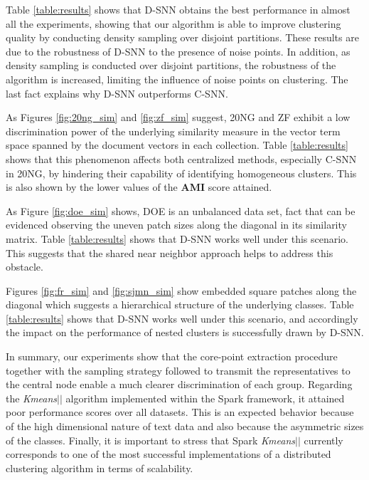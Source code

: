 \documentclass[smallextended]{svjour3}       %
\begin{document}
\noindent Table \ref{table:results} shows that D-SNN obtains the best performance in almost all the experiments, showing that our algorithm is able to improve clustering quality by conducting density sampling over disjoint partitions. These results are due to the robustness of D-SNN to the presence of noise points. In addition, as density sampling is conducted over disjoint partitions, the robustness of the algorithm is increased, limiting the influence of noise points on clustering. The last fact explains why D-SNN outperforms C-SNN.    


As Figures \ref{fig:20ng_sim} and \ref{fig:zf_sim} suggest, 20NG and ZF exhibit a low discrimination power of the underlying similarity measure in the vector term space spanned by the document vectors in each collection. Table \ref{table:results} shows that this phenomenon affects both centralized methods, especially C-SNN in 20NG, by hindering their capability of identifying homogeneous clusters. This is also shown by the lower values of the \textbf{AMI} score attained.

As Figure \ref{fig:doe_sim} shows, DOE is an unbalanced data set, fact that can be evidenced observing the uneven patch sizes along the diagonal in its similarity matrix. 
Table \ref{table:results} shows that D-SNN works well under this scenario. 
This suggests that the shared near neighbor approach helps to address this obstacle.

Figures \ref{fig:fr_sim} and \ref{fig:sjmn_sim} show embedded square patches along the diagonal which suggests a hierarchical structure of the underlying classes. 
Table \ref{table:results} shows that D-SNN works well under this scenario, and accordingly the impact on the performance of nested clusters is successfully drawn by D-SNN.

In summary, our experiments show that the core-point extraction procedure together with the sampling strategy followed to transmit the representatives to the central node enable a much clearer discrimination of each group. Regarding the \textit{Kmeans$||$} algorithm implemented within the Spark framework, it attained poor performance scores over all datasets. This is an expected behavior because of the high dimensional nature of text data and also because the asymmetric sizes of the classes. Finally, it is important to stress that Spark \textit{Kmeans$||$} currently corresponds to one of the most successful implementations of a distributed clustering algorithm in terms of scalability.
\end{document}
